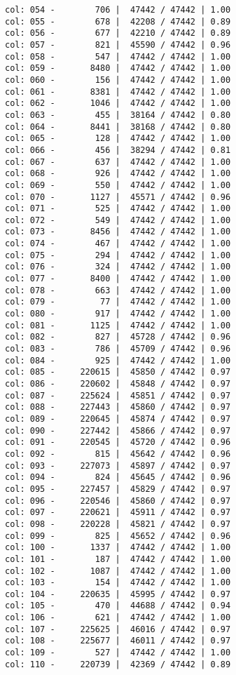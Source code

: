 \documentclass[11pt]{article}
\begin{document}
\begin{Verbatim}[commandchars=\\\{\}]
col: 054 -        706 |  47442 / 47442 | 1.00
col: 055 -        678 |  42208 / 47442 | 0.89
col: 056 -        677 |  42210 / 47442 | 0.89
col: 057 -        821 |  45590 / 47442 | 0.96
col: 058 -        547 |  47442 / 47442 | 1.00
col: 059 -       8480 |  47442 / 47442 | 1.00
col: 060 -        156 |  47442 / 47442 | 1.00
col: 061 -       8381 |  47442 / 47442 | 1.00
col: 062 -       1046 |  47442 / 47442 | 1.00
col: 063 -        455 |  38164 / 47442 | 0.80
col: 064 -       8441 |  38168 / 47442 | 0.80
col: 065 -        128 |  47442 / 47442 | 1.00
col: 066 -        456 |  38294 / 47442 | 0.81
col: 067 -        637 |  47442 / 47442 | 1.00
col: 068 -        926 |  47442 / 47442 | 1.00
col: 069 -        550 |  47442 / 47442 | 1.00
col: 070 -       1127 |  45571 / 47442 | 0.96
col: 071 -        525 |  47442 / 47442 | 1.00
col: 072 -        549 |  47442 / 47442 | 1.00
col: 073 -       8456 |  47442 / 47442 | 1.00
col: 074 -        467 |  47442 / 47442 | 1.00
col: 075 -        294 |  47442 / 47442 | 1.00
col: 076 -        324 |  47442 / 47442 | 1.00
col: 077 -       8400 |  47442 / 47442 | 1.00
col: 078 -        663 |  47442 / 47442 | 1.00
col: 079 -         77 |  47442 / 47442 | 1.00
col: 080 -        917 |  47442 / 47442 | 1.00
col: 081 -       1125 |  47442 / 47442 | 1.00
col: 082 -        827 |  45728 / 47442 | 0.96
col: 083 -        786 |  45709 / 47442 | 0.96
col: 084 -        925 |  47442 / 47442 | 1.00
col: 085 -     220615 |  45850 / 47442 | 0.97
col: 086 -     220602 |  45848 / 47442 | 0.97
col: 087 -     225624 |  45851 / 47442 | 0.97
col: 088 -     227443 |  45860 / 47442 | 0.97
col: 089 -     220645 |  45874 / 47442 | 0.97
col: 090 -     227442 |  45866 / 47442 | 0.97
col: 091 -     220545 |  45720 / 47442 | 0.96
col: 092 -        815 |  45642 / 47442 | 0.96
col: 093 -     227073 |  45897 / 47442 | 0.97
col: 094 -        824 |  45645 / 47442 | 0.96
col: 095 -     227457 |  45829 / 47442 | 0.97
col: 096 -     220546 |  45860 / 47442 | 0.97
col: 097 -     220621 |  45911 / 47442 | 0.97
col: 098 -     220228 |  45821 / 47442 | 0.97
col: 099 -        825 |  45652 / 47442 | 0.96
col: 100 -       1337 |  47442 / 47442 | 1.00
col: 101 -        187 |  47442 / 47442 | 1.00
col: 102 -       1087 |  47442 / 47442 | 1.00
col: 103 -        154 |  47442 / 47442 | 1.00
col: 104 -     220635 |  45995 / 47442 | 0.97
col: 105 -        470 |  44688 / 47442 | 0.94
col: 106 -        621 |  47442 / 47442 | 1.00
col: 107 -     225625 |  46016 / 47442 | 0.97
col: 108 -     225677 |  46011 / 47442 | 0.97
col: 109 -        527 |  47442 / 47442 | 1.00
col: 110 -     220739 |  42369 / 47442 | 0.89

\end{Verbatim}
\end{document}
